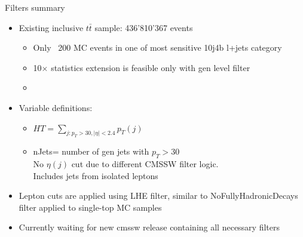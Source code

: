 \documentclass{beamer}
\begin{document}
\begin{frame}{Filters summary }

\begin{itemize}
\item Existing inclusive $t\bar{t}$ sample: 436'810'367 events
\begin{itemize}
\item Only ~200 MC events in one of most sensitive 10j4b l+jets category
\item 10$\times$ statistics extension is feasible only with gen level filter
\item 
\end{itemize}
\end{itemize}

\begin{itemize}
\item Variable definitions:
\begin{itemize}
\item $HT=\sum\limits_{j:p_T>30,|\eta|<2.4} {p_T(j)}$
\item nJets= number of gen jets with $p_T>30$\\
No $\eta(j)$ cut due to different CMSSW filter logic.\\
Includes jets from isolated leptons
\end{itemize}
\item Lepton cuts are applied using LHE filter, similar to NoFullyHadronicDecays filter applied to single-top MC samples
\end{itemize}
\begin{itemize}
\item Currently waiting for new cmssw release containing all necessary filters
\end{itemize}

\end{frame}
\end{document}

